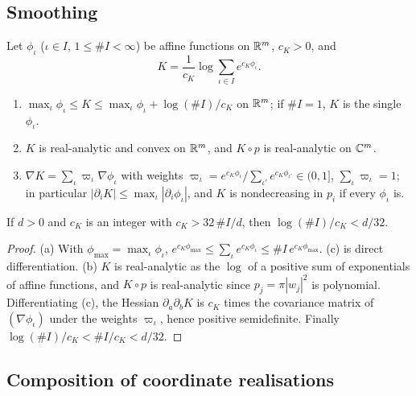 \subsection{Smoothing}\label{sec:fcp-smoothing}

\begin{lemma}\label{lem:fcp-smoothing}
Let $\phi_\iota$ ($\iota\in I$, $1\le\#I<\infty$) be affine functions on $\mathbb{R}^m$, $c_K>0$, and
\[
 K=\frac1{c_K}\log\sum_{\iota\in I}e^{c_K\phi_\iota}.
\]
\begin{enumerate}[label=(\alph*)]
\item $\max_\iota\phi_\iota\le K\le\max_\iota\phi_\iota+\log(\#I)/c_K$ on $\mathbb{R}^m$; if $\#I=1$, $K$ is the single
 $\phi_\iota$.
\item $K$ is real-analytic and convex on $\mathbb{R}^m$, and $K\circ p$ is real-analytic on $\mathbb{C}^m$.
\item $\nabla K=\sum_\iota\varpi_\iota\nabla\phi_\iota$ with weights
 $\varpi_\iota=e^{c_K\phi_\iota}/\sum_{\iota'}e^{c_K\phi_{\iota'}}\in(0,1]$, $\sum_\iota\varpi_\iota=1$; in particular
 $|\partial_iK|\le\max_\iota|\partial_i\phi_\iota|$, and $K$ is nondecreasing in $p_i$ if every $\phi_\iota$ is.
\end{enumerate}
If $d>0$ and $c_K$ is an integer with $c_K>32\,\#I/d$, then $\log(\#I)/c_K<d/32$.
\end{lemma}

\begin{proof}
(a) With $\phi_{\max}=\max_\iota\phi_\iota$, $e^{c_K\phi_{\max}}\le\sum_\iota e^{c_K\phi_\iota}\le\#I\,e^{c_K\phi_{\max}}$. (c) is direct differentiation. (b) $K$ is real-analytic as the $\log$ of a positive sum of exponentials of affine functions, and $K\circ p$ is real-analytic since $p_j=\pi|w_j|^2$ is polynomial. Differentiating (c), the Hessian $\partial_a\partial_bK$ is $c_K$ times the covariance matrix of $(\nabla\phi_\iota)$ under the weights $\varpi_\iota$, hence positive semidefinite. Finally $\log(\#I)/c_K<\#I/c_K<d/32$.
\end{proof}

\subsection{Composition of coordinate realisations}\label{sec:fcp-composition}

